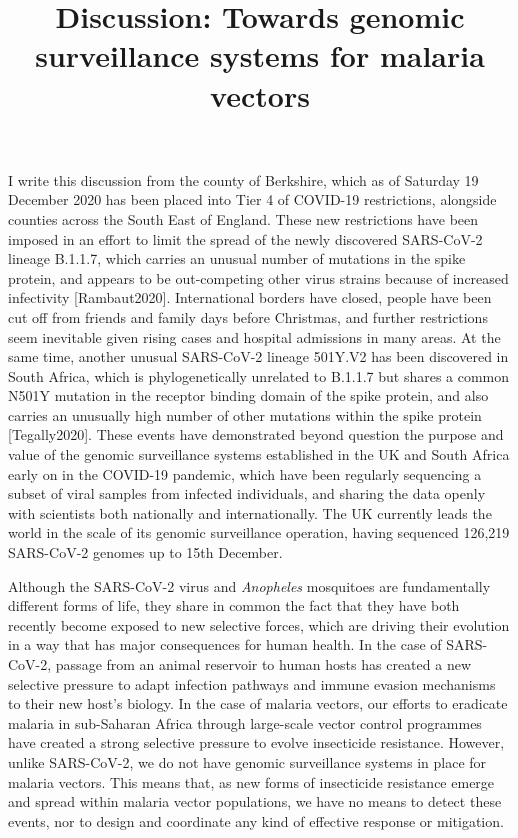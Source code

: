 \documentclass[a4paper,11pt,abstracton,hidelinks]{scrartcl}
\title{
Discussion: Towards genomic surveillance systems for malaria vectors
}
\author{}
\begin{document}
\renewcommand{\abstractname}{Summary}


\maketitle


I write this discussion from the county of Berkshire, which as of Saturday 19 December 2020 has been placed into Tier 4 of COVID-19 restrictions, alongside counties across the South East of England.
%
These new restrictions have been imposed in an effort to limit the spread of the newly discovered SARS-CoV-2 lineage B.1.1.7, which carries an unusual number of mutations in the spike protein, and appears to be out-competing other virus strains because of increased infectivity [Rambaut2020].
%
International borders have closed, people have been cut off from friends and family days before Christmas, and further restrictions seem inevitable given rising cases and hospital admissions in many areas.
%
At the same time, another unusual SARS-CoV-2 lineage 501Y.V2 has been discovered in South Africa, which is phylogenetically unrelated to B.1.1.7 but shares a common N501Y mutation in the receptor binding domain of the spike protein, and also carries an unusually high number of other mutations within the spike protein [Tegally2020].
%
These events have demonstrated beyond question the purpose and value of the genomic surveillance systems established in the UK and South Africa early on in the COVID-19 pandemic, which have been regularly sequencing a subset of viral samples from infected individuals, and sharing the data openly with scientists both nationally and internationally.
%
The UK currently leads the world in the scale of its genomic surveillance operation, having sequenced 126,219 SARS-CoV-2 genomes up to 15th December.


Although the SARS-CoV-2 virus and \textit{Anopheles} mosquitoes are fundamentally different forms of life, they share in common the fact that they have both recently become exposed to new selective forces, which are driving their evolution in a way that has major consequences for human health.
%
In the case of SARS-CoV-2, passage from an animal reservoir to human hosts has created a new selective pressure to adapt infection pathways and immune evasion mechanisms to their new host's biology.
%
In the case of malaria vectors, our efforts to eradicate malaria in sub-Saharan Africa through large-scale vector control programmes have created a strong selective pressure to evolve insecticide resistance.
%
However, unlike SARS-CoV-2, we do not have genomic surveillance systems in place for malaria vectors.
%
This means that, as new forms of insecticide resistance emerge and spread within malaria vector populations, we have no means to detect these events, nor to design and coordinate any kind of effective response or mitigation.
\end{document}
